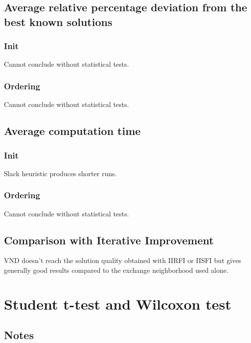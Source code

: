 \documentclass[a4paper,12pt]{article}
\begin{document}
\subsection{Average relative percentage deviation from the best known solutions}

\subsubsection{Init}

Cannot conclude without statistical tests.

\subsubsection{Ordering}

Cannot conclude without statistical tests.

\subsection{Average computation time}


\subsubsection{Init}

Slack heuristic produces shorter runs.

\subsubsection{Ordering}

Cannot conclude without statistical tests.




\subsection{Comparison with Iterative Improvement}


VND doesn't reach the solution quality obtained with IIRFI or IISFI but gives generally good results compared to the exchange neighborhood used alone.
\newpage\cleardoublepage{}
\section{Student t-test and Wilcoxon test}

\subsection{Notes}
\end{document}
